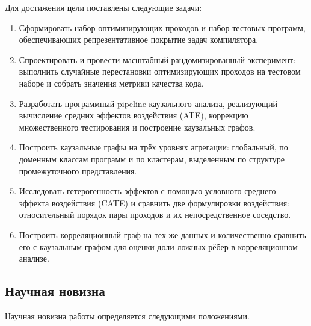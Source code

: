 Для достижения цели поставлены следующие задачи:

\begin{enumerate}
    \item Сформировать набор оптимизирующих проходов и набор тестовых программ, обеспечивающих репрезентативное покрытие задач компилятора.
    \item Спроектировать и провести масштабный рандомизированный эксперимент: выполнить случайные перестановки оптимизирующих проходов на тестовом наборе и собрать значения метрики качества кода.
    \item Разработать программный pipeline каузального анализа, реализующий вычисление средних эффектов воздействия (ATE), коррекцию множественного тестирования и построение каузальных графов.
    \item Построить каузальные графы на трёх уровнях агрегации: глобальный, по доменным классам программ и по кластерам, выделенным по структуре промежуточного представления.
    \item Исследовать гетерогенность эффектов с помощью условного среднего эффекта воздействия (CATE) и сравнить две формулировки воздействия: относительный порядок пары проходов и их непосредственное соседство.
    \item Построить корреляционный граф на тех же данных и количественно сравнить его с каузальным графом для оценки доли ложных рёбер в корреляционном анализе.
\end{enumerate}

\subsection{Научная новизна}

Научная новизна работы определяется следующими положениями.

